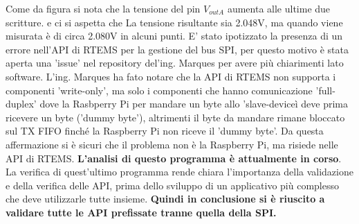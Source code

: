 \documentclass[12pt, a4paper, titlepage, oneside]{book}
\begin{document}
\newline
Come da figura si nota che la tensione del pin $V_{outA}$ aumenta alle ultime due scritture.
e ci si aspetta che La tensione risultante sia 2.048V, ma quando viene misurata è di circa 2.080V in alcuni punti.\newline
E' stato ipotizzato la presenza di un errore nell'API di RTEMS per la gestione del bus SPI, per questo motivo è stata aperta una 'issue' nel repository del'ing. Marques per avere più chiarimenti lato software.\newline
L'ing. Marques ha fato notare che la API di RTEMS non supporta i componenti 'write-only', ma solo i componenti che hanno comunicazione 'full-duplex' dove la Rasbperry Pi per mandare un byte allo 'slave-deviceì deve prima ricevere un byte ('dummy byte'), altrimenti il byte da mandare rimane bloccato sul TX FIFO finché la Raspberry Pi non riceve il 'dummy byte'.\newline
Da questa affermazione si è sicuri che il problema non è la Raspberry Pi, ma risiede nelle API di RTEMS.
\textbf{L'analisi di questo programma è attualmente in corso}.\newline
La verifica di quest'ultimo programma rende chiara l'importanza della validazione e della verifica delle API, prima dello sviluppo di un applicativo più complesso che deve utilizzarle tutte insieme.\newline
\textbf{Quindi in conclusione si è riuscito a validare tutte le API prefissate tranne quella della SPI.\newline
}
\end{document}
